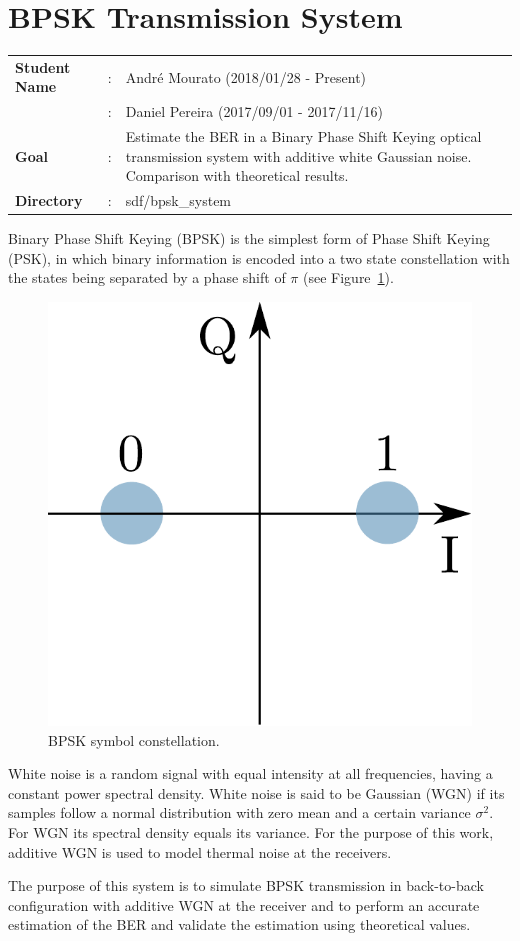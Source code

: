 \clearpage
\section{BPSK Transmission System}

\begin{tcolorbox}	
\begin{tabular}{p{2.75cm} p{0.2cm} p{10.5cm}} 	
\textbf{Student Name}  &:&  Andr\'e Mourato (2018/01/28 - Present)\\
\textbf{}  &:&  Daniel Pereira (2017/09/01 - 2017/11/16)\\
\textbf{Goal}          &:& Estimate the BER in a Binary Phase Shift Keying optical transmission system with additive white Gaussian noise. Comparison with theoretical results.\\
\textbf{Directory}              &:& sdf/bpsk\_system
\end{tabular}
\end{tcolorbox}

Binary Phase Shift Keying (BPSK) is the simplest form of Phase Shift Keying (PSK), in which binary information is encoded into a two state constellation with the states being separated by a phase shift of $\pi$ (see Figure~\ref{fig:BPSKConst}).

\begin{figure}[h]
\centering
\includegraphics[width=.3\linewidth]{./sdf/bpsk_system/figures/bpskconstellation.pdf}
\caption{BPSK symbol constellation.}
\label{fig:BPSKConst}
\end{figure}

\par
White noise is a random signal with equal intensity at all frequencies, having a constant power spectral density. White noise is said to be Gaussian (WGN) if its samples follow a normal distribution with zero mean and a certain variance $\sigma^2$. For WGN its spectral density equals its variance. For the purpose of this work, additive WGN is used to model thermal noise at the receivers.
\par
The purpose of this system is to simulate BPSK transmission in back-to-back configuration with additive WGN at the receiver and to perform an accurate estimation of the BER and validate the estimation using theoretical values.


